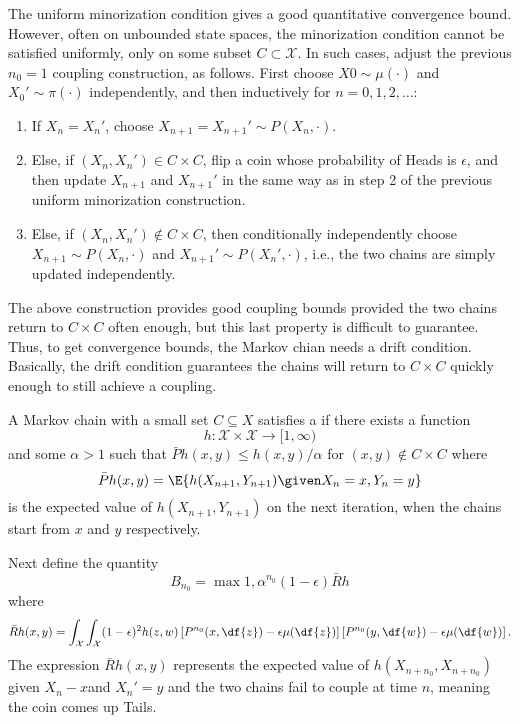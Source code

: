 \documentclass[12pt]{article}
\begin{document}
The uniform minorization condition gives a good quantitative convergence
bound.  However, often on unbounded state spaces, the minorization
condition cannot be satisfied uniformly, only on some subset \( C
\subset \mathcal{X} \).  In such cases, adjust the previous \( n_0 = 1 \)
coupling construction, as follows.  First choose \( X0 \sim \mu(\cdot) \)
and \( X_0' \sim \pi(\cdot) \) independently, and then inductively for \(
n = 0, 1, 2, \dots \):
\begin{enumerate}
    \item
        If \( X_n = X_n' \), choose \( X_{n+1} = X_{n+1}' \sim P(X_n,
        \cdot) \).
    \item
        Else, if \( (X_n , X_n') \in C \times C \), flip a coin whose
        probability of Heads is \( \epsilon \), and then update \( X_{n+1}
        \) and \( X_{n+1}' \) in the same way as in step 2 of the
        previous uniform minorization construction.
    \item
        Else, if \( (X_n, X_n' ) \notin C \times C \), then
        conditionally independently choose \( X_{n+1} \sim P(X_n, \cdot)
        \) and \( X_{n+1}' \sim P(X_n', \cdot) \), i.e., the two chains
        are simply updated independently.
\end{enumerate}

The above construction provides good coupling bounds provided the two
chains return to \( C \times C \) often enough, but this last property
is difficult to guarantee.  Thus, to get convergence bounds, the Markov
chian needs a drift condition.  Basically, the drift condition
guarantees the chains will return to \( C \times C \) quickly enough to
still achieve a coupling.

\begin{definition}
    A Markov chain with a small set \( C \subseteq X \) satisfies a
     if there exists a function
    \[
        h :  \mathcal{X} \times \mathcal{X} \to [1, \infty)
    \] and some \( \alpha > 1 \) such that \( \bar{P}h(x,y) \le h(x,y)/\alpha
    \) for \( (x,y) \notin C \times C \) where
    \[
        \bar{P}h(x,y)= \E{h(X_{n+1}, Y_{n+1}) \given X_n = x, Y_n = y}
    \] is the expected value of \( h(X_{n+1}, Y_{n+1}) \) on the next
    iteration, when the chains start from \( x \) and \( y \)
    respectively.
\end{definition}

Next define the quantity
\[
    B_{n_0} = \max{1, \alpha^{n_0}(1-\epsilon) \bar{R}h}
\] where
\[
    \bar{R}h(x,y) = \int_{\mathcal{X}} \int_{\mathcal{X}} (1-\epsilon)^2
    h(z,w) \left[ P^{n_0}(x, \df{z}) - \epsilon \mu(\df{z}) \right]
    \left[ P^{n_0}(y, \df{w}) - \epsilon \mu(\df{w}) \right].
\] The expression \( \bar{R}h(x,y) \) represents the expected value of \(
h(X_{n+{n_0}}, X_{n+{n_0}}) \) given \( X_n - x \)and \( X_n' = y \) and
the two chains fail to couple at time \( n \), meaning the coin comes up
Tails.
\end{document}
